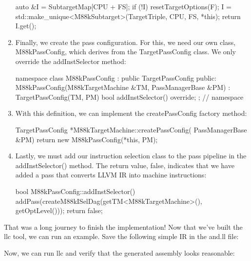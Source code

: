 \begin{enumerate}
\begin{cpp}
{    auto &I = SubtargetMap[CPU + FS];
    if (!I) {
        resetTargetOptions(F);
        I = std::make_unique<M88kSubtarget>(TargetTriple,
                                            CPU, FS, *this);
    }
    return I.get();
}
\end{cpp}

\item
Finally, we create the pass configuration. For this, we need our own class, M88kPassConfig, which derives from the TargetPassConfig class. We only override the addInstSelector method:

\begin{cpp}
namespace {
class M88kPassConfig : public TargetPassConfig {
    public:
    M88kPassConfig(M88kTargetMachine &TM,
                   PassManagerBase &PM)
        : TargetPassConfig(TM, PM) {}
    bool addInstSelector() override;
};
} // namespace
\end{cpp}

\item
With this definition, we can implement the createPassConfig factory method:

\begin{cpp}
TargetPassConfig *M88kTargetMachine::createPassConfig(
        PassManagerBase &PM) {
    return new M88kPassConfig(*this, PM);
}
\end{cpp}

\item
Lastly, we must add our instruction selection class to the pass pipeline in the addInstSelector() method. The return value, false, indicates that we have added a pass that converts LLVM IR into machine instructions:

\begin{cpp}
bool M88kPassConfig::addInstSelector() {
        addPass(createM88kISelDag(getTM<M88kTargetMachine>(),
                                  getOptLevel()));
    return false;
}
\end{cpp}
\end{enumerate}

That was a long journey to finish the implementation! Now that we’ve built the llc tool, we can run an example. Save the following simple IR in the and.ll file:


Now, we can run llc and verify that the generated assembly looks reasonable:

